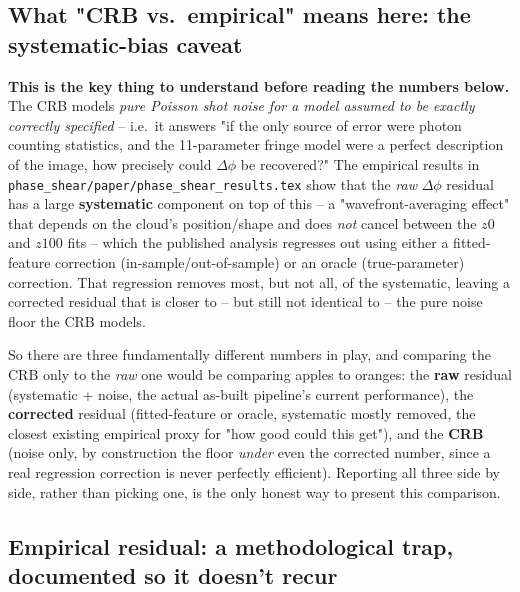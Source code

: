 \documentclass[11pt,a4paper]{article}
\newcommand{\code}[1]{\texttt{#1}}
\begin{document}
\subsection{What "CRB vs.\ empirical" means here: the systematic-bias caveat}
\label{sec:ps-caveat}

\textbf{This is the key thing to understand before reading the numbers
below.} The CRB models \emph{pure Poisson shot noise for a model assumed to
be exactly correctly specified} -- i.e.\ it answers "if the only source of
error were photon counting statistics, and the 11-parameter fringe model
were a perfect description of the image, how precisely could $\Delta\phi$
be recovered?" The empirical results in
\code{phase\_shear/paper/phase\_shear\_results.tex} show that the
\emph{raw} $\Delta\phi$ residual has a large \textbf{systematic} component
on top of this -- a "wavefront-averaging effect" that depends on the
cloud's position/shape and does \emph{not} cancel between the $z0$ and
$z100$ fits -- which the published analysis regresses out using either a
fitted-feature correction (in-sample/out-of-sample) or an oracle
(true-parameter) correction. That regression removes most, but not all, of
the systematic, leaving a corrected residual that is closer to -- but still
not identical to -- the pure noise floor the CRB models.

So there are three fundamentally different numbers in play, and comparing
the CRB only to the \emph{raw} one would be comparing apples to oranges: the
\textbf{raw} residual (systematic + noise, the actual as-built pipeline's
current performance), the \textbf{corrected} residual (fitted-feature or
oracle, systematic mostly removed, the closest existing empirical proxy
for "how good could this get"), and the \textbf{CRB} (noise only, by
construction the floor \emph{under} even the corrected number, since a real
regression correction is never perfectly efficient). Reporting all three
side by side, rather than picking one, is the only honest way to present
this comparison.

\subsection{Empirical residual: a methodological trap, documented so it
doesn't recur}
\label{sec:ps-trap}
\end{document}
